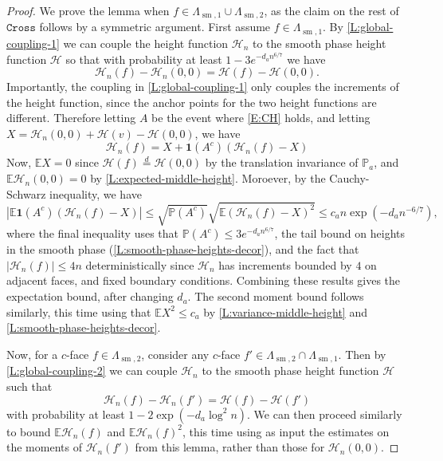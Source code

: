 \documentclass[11pt,twoside]{amsart}
\theoremstyle{plain}
\numberwithin{quest}{section}
\theoremstyle{remark}
\numberwithin{rem}{section}
\theoremstyle{definition}
\renewcommand{\P}{\mathbb{P}}
\newcommand{\E}{\mathbb{E}}
\renewcommand{\tt}[1]{{\mathtt{#1}}}
\begin{document}
	\begin{proof}
		We prove the lemma when $f \in \Lambda_{\operatorname{sm}, 1} \cup \Lambda_{\operatorname{sm}, 2}$, as the claim on the rest of $\tt{Cross}$ follows by a symmetric argument. First assume $f \in \Lambda_{\operatorname{sm}, 1}$. By \cref{L:global-coupling-1} we can couple the height function $\mathcal{H}_n$ to the smooth phase height function $\mathcal H$ so that with probability at least $1 - 3 e^{-d_a n^{6/7}}$ we have
		\begin{equation}\label{E:CH}
			\mathcal H_n(f) - \mathcal H_n(0,0) = \mathcal H(f) - \mathcal H(0,0).
		\end{equation}
		Importantly, the coupling in \cref{L:global-coupling-1} only couples the increments of the height function, since the anchor points for the two height functions are different. Therefore letting $A$ be the event where \eqref{E:CH} holds, and letting $X = \mathcal H_n(0,0) + \mathcal H(v) - \mathcal H(0,0)$,  we have
		\begin{equation*}
			\mathcal H_n(f) = X + \mathbf{1}(A^c)(\mathcal H_n(f) -X)
		\end{equation*}
		Now, $\E X = 0$ since $\mathcal H(f) \stackrel{d}{=} \mathcal H(0,0)$ by the translation invariance of $\P_a$, and $\E \mathcal H_n(0,0) = 0$ by \cref{L:expected-middle-height}. Moroever, by the Cauchy-Schwarz inequality, we have
        $$
        |\E \mathbf{1}(A^c)(\mathcal H_n(f) -X)| \le \sqrt{\P(A^c)} \sqrt{\E (\mathcal H_n(f) -X)^2} \le c_a n \exp(-d_a n^{-6/7}),
        $$
        where the final inequality uses that $\P(A^c) \le 3 e^{-d_a n^{6/7}}$, the tail bound on heights in the smooth phase (\cref{L:smooth-phase-heights-decor}), and the fact that $|\mathcal H_n(f)| \le 4n$ deterministically since $\mathcal H_n$ has increments bounded by $4$ on adjacent faces, and fixed boundary conditions. Combining these results gives the expectation bound, after changing $d_a$. The second moment bound follows similarly, this time using that $\E X^2 \le c_a$ by \cref{L:variance-middle-height} and \cref{L:smooth-phase-heights-decor}.
		
		Now, for a $c$-face $f \in \Lambda_{\operatorname{sm}, 2}$, consider any $c$-face $f' \in \Lambda_{\operatorname{sm}, 2} \cap  \Lambda_{\operatorname{sm}, 1}$. Then by \cref{L:global-coupling-2} we can couple $\mathcal H_n$ to the smooth phase height function $\mathcal H$ such that
		\begin{equation*}
			\mathcal H_n(f) - \mathcal H_n(f') = \mathcal H(f) - \mathcal H(f')
		\end{equation*}
		with probability at least $1 - 2 \exp(-d_a \log^2 n)$. We can then proceed similarly to bound $\E \mathcal H_n(f)$ and $\E \mathcal H_n(f)^2$, this time using as input the estimates on the moments of $\mathcal H_n(f')$ from this lemma, rather than those for $\mathcal H_n(0,0)$.
	\end{proof}
	
\end{document}
